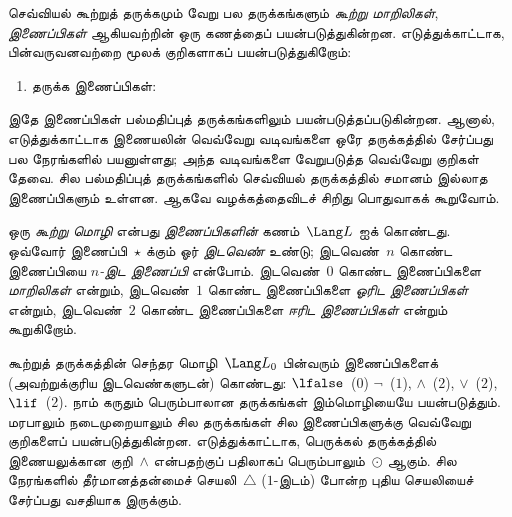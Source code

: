 \documentclass[../../../include/open-logic-section]{subfiles}
\begin{document}


செவ்வியல் கூற்றுத் தருக்கமும் வேறு பல தருக்கங்களும் \emph{கூற்று
மாறிலிகள்}, \emph{இணைப்பிகள்} ஆகியவற்றின் ஒரு கணத்தைப் பயன்படுத்துகின்றன.
எடுத்துக்காட்டாக,
பின்வருவனவற்றை மூலக் குறிகளாகப் பயன்படுத்துகிறோம்:
\begin{enumerate}
\item தருக்க இணைப்பிகள்:
  \startycommalist
\end{enumerate}

இதே இணைப்பிகள் பல்மதிப்புத் தருக்கங்களிலும் பயன்படுத்தப்படுகின்றன. ஆனால்,
எடுத்துக்காட்டாக இணையலின் வெவ்வேறு வடிவங்களை ஒரே தருக்கத்தில் சேர்ப்பது
பல நேரங்களில் பயனுள்ளது; அந்த வடிவங்களை வேறுபடுத்த வெவ்வேறு குறிகள் தேவை.
சில பல்மதிப்புத் தருக்கங்களில் செவ்வியல் தருக்கத்தில் சமானம் இல்லாத
இணைப்பிகளும் உள்ளன. ஆகவே வழக்கத்தைவிடச் சிறிது பொதுவாகக் கூறுவோம்.

\begin{defn}
  ஒரு \emph{கூற்று மொழி} என்பது \emph{இணைப்பிகளின்} கணம்~$\Lang L$ ஐக்
  கொண்டது. ஒவ்வோர் இணைப்பி~$\star$ க்கும் ஓர் \emph{இடவெண்} உண்டு;
  இடவெண்~$n$ கொண்ட இணைப்பியை \emph{$n$-இட இணைப்பி} என்போம்.
  இடவெண்~$0$ கொண்ட இணைப்பிகளை \emph{மாறிலிகள்} என்றும், இடவெண்~$1$
  கொண்ட இணைப்பிகளை \emph{ஓரிட இணைப்பிகள்} என்றும், இடவெண்~$2$ கொண்ட
  இணைப்பிகளை \emph{ஈரிட இணைப்பிகள்} என்றும் கூறுகிறோம்.
\end{defn}

\begin{ex}
  கூற்றுத் தருக்கத்தின் செந்தர மொழி~$\Lang L_0$ பின்வரும் இணைப்பிகளைக்
  (அவற்றுக்குரிய இடவெண்களுடன்) கொண்டது:
  $\lfalse$~($0$)
  $\lnot$~($1$),
  $\land$~($2$),
  $\lor$~($2$),
  $\lif$~($2$). நாம் கருதும் பெரும்பாலான தருக்கங்கள் இம்மொழியையே
  பயன்படுத்தும்.
  மரபாலும் நடைமுறையாலும் சில தருக்கங்கள் சில இணைப்பிகளுக்கு வெவ்வேறு
  குறிகளைப் பயன்படுத்துகின்றன. எடுத்துக்காட்டாக, பெருக்கல் தருக்கத்தில்
  இணையலுக்கான குறி~$\land$ என்பதற்குப் பதிலாகப் பெரும்பாலும்~$\odot$ ஆகும்.
  சில நேரங்களில் தீர்மானத்தன்மைச் செயலி~$\triangle$ ($1$-இடம்) போன்ற
  புதிய செயலியைச் சேர்ப்பது வசதியாக இருக்கும்.
\end{ex}
\end{document}
